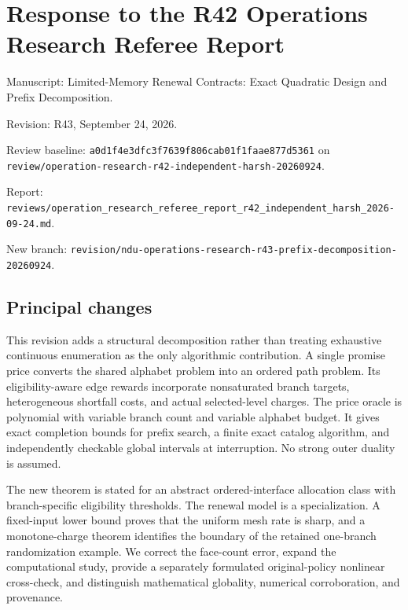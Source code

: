 \documentclass[11pt,letterpaper]{article}
\begin{document}
\section*{Response to the R42 Operations Research Referee Report}


Manuscript: Limited-Memory Renewal Contracts: Exact Quadratic Design and Prefix Decomposition.



Revision: R43, September 24, 2026.



Review baseline: \nolinkurl{a0d1f4e3dfc3f7639f806cab01f1faae877d5361} on \nolinkurl{review/operation-research-r42-independent-harsh-20260924}.



Report: \nolinkurl{reviews/operation_research_referee_report_r42_independent_harsh_2026-09-24.md}.



New branch: \nolinkurl{revision/ndu-operations-research-r43-prefix-decomposition-20260924}.



\subsection*{Principal changes}


This revision adds a structural decomposition rather than treating exhaustive continuous enumeration as the only algorithmic contribution. A single promise price converts the shared alphabet problem into an ordered path problem. Its eligibility-aware edge rewards incorporate nonsaturated branch targets, heterogeneous shortfall costs, and actual selected-level charges. The price oracle is polynomial with variable branch count and variable alphabet budget. It gives exact completion bounds for prefix search, a finite exact catalog algorithm, and independently checkable global intervals at interruption. No strong outer duality is assumed.



The new theorem is stated for an abstract ordered-interface allocation class with branch-specific eligibility thresholds. The renewal model is a specialization. A fixed-input lower bound proves that the uniform mesh rate is sharp, and a monotone-charge theorem identifies the boundary of the retained one-branch randomization example. We correct the face-count error, expand the computational study, provide a separately formulated original-policy nonlinear cross-check, and distinguish mathematical globality, numerical corroboration, and provenance.
\end{document}
